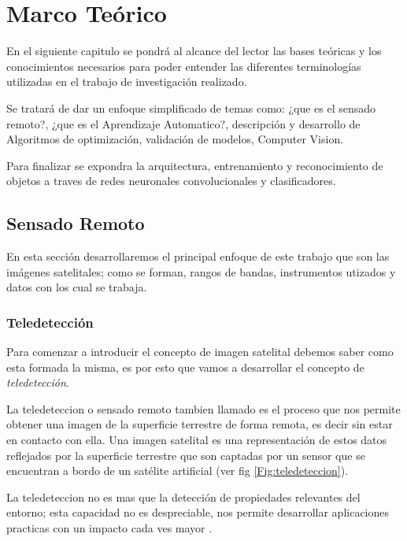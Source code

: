 \chapter{Marco Teórico} \label{chap:marcoteorico}

En el siguiente capitulo se pondrá al alcance del lector las bases teóricas y los conocimientos necesarios para poder entender las diferentes terminologías utilizadas en el trabajo de investigación realizado.

Se tratará de dar un enfoque simplificado de temas como: ¿que es el sensado remoto?, ¿que es el Aprendizaje Automatico?, descripción y desarrollo de Algoritmos de optimización, validación de modelos, Computer Vision.

Para finalizar se expondra la arquitectura, entrenamiento y reconocimiento de objetos a traves de  redes neuronales convolucionales y clasificadores.

\section{Sensado Remoto}\label{sec:sensadoremoto}

En esta sección desarrollaremos el principal enfoque de este trabajo que son las imágenes satelitales; como se forman, rangos de bandas, instrumentos utizados y datos con los cual se trabaja.

\subsection{Teledetección}\label{sub:teledeteccion}

Para comenzar a introducir el concepto de imagen satelital debemos saber como esta formada la misma, es por esto que vamos a desarrollar el concepto de \textit{teledetección}.

La teledeteccion o sensado remoto tambien llamado es el proceso que nos permite obtener una imagen de la superficie terrestre de forma remota, es decir sin estar en contacto con ella. Una imagen satelital es una representación de estos datos reflejados por la superficie terrestre que son captadas por un sensor que se encuentran a bordo de un satélite artificial (ver fig \ref{Fig:teledeteccion}).

La teledeteccion no es mas que la detección de propiedades relevantes del entorno; esta capacidad no es despreciable, nos permite desarrollar aplicaciones practicas con un impacto cada ves mayor \citep{percepcion}. 


